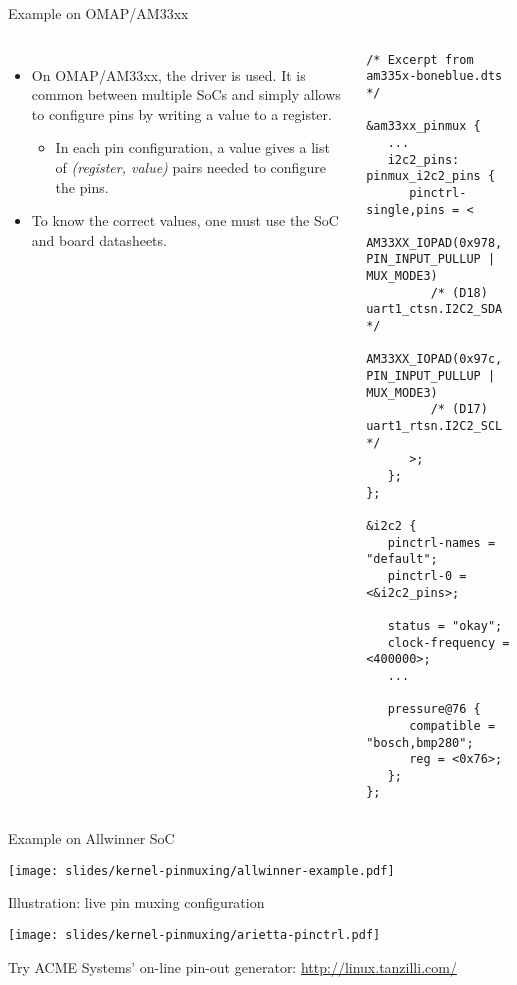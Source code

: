 \begin{frame}[fragile]{Example on OMAP/AM33xx}
  \begin{columns}
    \begin{itemize}
      \small
    \item On OMAP/AM33xx, the  driver is used. It
      is common between multiple SoCs and simply allows to configure
      pins by writing a value to a register.
      \begin{itemize}
      \item In each pin configuration, a  value
        gives a list of {\em (register, value)} pairs needed to configure
        the pins.
      \end{itemize}
    \item To know the correct values, one must use the SoC and board
      datasheets.
    \end{itemize}
    \begin{verbatim}
/* Excerpt from am335x-boneblue.dts */

&am33xx_pinmux {
   ...
   i2c2_pins: pinmux_i2c2_pins {
      pinctrl-single,pins = <
         AM33XX_IOPAD(0x978, PIN_INPUT_PULLUP | MUX_MODE3)
         /* (D18) uart1_ctsn.I2C2_SDA */
         AM33XX_IOPAD(0x97c, PIN_INPUT_PULLUP | MUX_MODE3)
         /* (D17) uart1_rtsn.I2C2_SCL */
      >;
   };
};

&i2c2 {
   pinctrl-names = "default";
   pinctrl-0 = <&i2c2_pins>;

   status = "okay";
   clock-frequency = <400000>;
   ...

   pressure@76 {
      compatible = "bosch,bmp280";
      reg = <0x76>;
   };
};
    \end{verbatim}
  \end{columns}
\end{frame}

\begin{frame}[fragile]{Example on Allwinner SoC}
  \begin{center}
    \texttt{[image: slides/kernel-pinmuxing/allwinner-example.pdf]}
  \end{center}
\end{frame}

\begin{frame}[fragile]{Illustration: live pin muxing configuration}
  \begin{center}
    \texttt{[image: slides/kernel-pinmuxing/arietta-pinctrl.pdf]}
  \end{center}
  Try ACME Systems' on-line pin-out generator: \url{http://linux.tanzilli.com/}
\end{frame}

